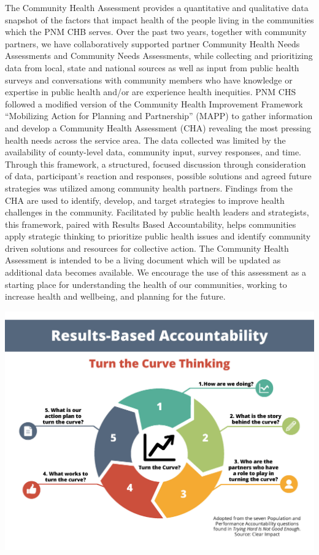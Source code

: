 \documentclass[
  a4paper,
  landscape]{scrreprt}
\begin{document}
The Community Health Assessment provides a quantitative and qualitative
data snapshot of the factors that impact health of the people living in
the communities which the PNM CHB serves. Over the past two years,
together with community partners, we have collaboratively supported
partner Community Health Needs Assessments and Community Needs
Assessments, while collecting and prioritizing data from local, state
and national sources as well as input from public health surveys and
conversations with community members who have knowledge or expertise in
public health and/or are experience health inequities. PNM CHS followed
a modified version of the Community Health Improvement Framework
``Mobilizing Action for Planning and Partnership'' (MAPP) to gather
information and develop a Community Health Assessment (CHA) revealing
the most pressing health needs across the service area. The data
collected was limited by the availability of county-level data,
community input, survey responses, and time. Through this framework, a
structured, focused discussion through consideration of data,
participant's reaction and responses, possible solutions and agreed
future strategies was utilized among community health partners. Findings
from the CHA are used to identify, develop, and target strategies to
improve health challenges in the community. Facilitated by public health
leaders and strategists, this framework, paired with Results Based
Accountability, helps communities apply strategic thinking to prioritize
public health issues and identify community driven solutions and
resources for collective action. The Community Health Assessment is
intended to be a living document which will be updated as additional
data becomes available. We encourage the use of this assessment as a
starting place for understanding the health of our communities, working
to increase health and wellbeing, and planning for the future.

\includegraphics{pages/Attachments/Introduction/RBATurningtheCurve.png}
\end{document}
